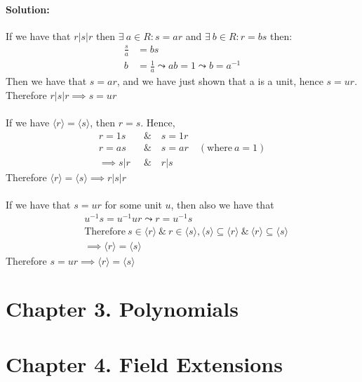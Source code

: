 \documentclass{article}
\begin{document}
\paragraph{Solution:}
If we have that $r|s|r$ then $\exists\ a \in R: s = ar$ and $ \exists\ b \in R: r = bs$ then:
    \begin{equation*}
        \begin{aligned}
            \frac{s}{a} &= bs\\
            b &= \frac{1}{a} \leadsto ab=1 \leadsto b = a^{-1}
        \end{aligned}
    \end{equation*}
Then we have that $s=ar$, and we have just shown that a is a unit, hence $s=ur$. Therefore $r|s|r \implies s = ur$
\\\\
If we have $\langle r \rangle = \langle s \rangle$, then $r=s$. Hence, 
\begin{equation*}
    \begin{aligned}
        r = 1s \quad &\&\quad s = 1r\\
        r = as \quad &\&\quad s = ar\quad (\text{where}\ a=1)\\
        \implies s|r  \ &\&\quad r|s
    \end{aligned}
\end{equation*}
Therefore $\langle r \rangle = \langle s \rangle \implies r|s|r$
\\\\
If we have that $s=ur$ for some unit $u$, then also we have that
\begin{equation*}
    \begin{aligned}
        &u^{-1}s = u^{-1}ur \leadsto r = u^{-1}s\\
        &\text{Therefore}\ s \in \langle r \rangle\ \&\ r \in \langle s \rangle, \langle s \rangle \subseteq \langle r \rangle\ \&\ \langle r \rangle \subseteq \langle s \rangle \\
        &\implies  \langle r \rangle = \langle s \rangle
    \end{aligned}
\end{equation*}
Therefore $s=ur \implies \langle r \rangle = \langle s \rangle$

\section*{Chapter 3. Polynomials}

\section*{Chapter 4. Field Extensions}
\end{document}
